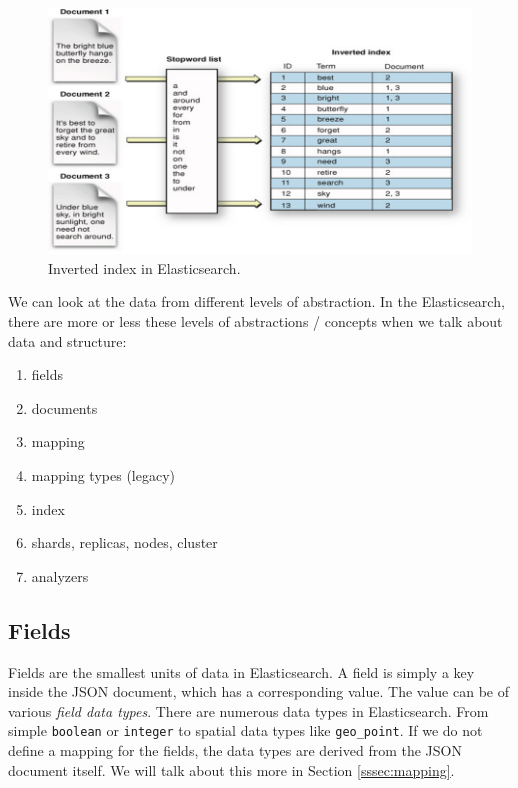 \documentclass[12pt,a4,twoside]{article}
\begin{document}
\begin{figure}[t]
\centering
\includegraphics[width=1\textwidth]{figures/inverted_index.png}
\caption{Inverted index in Elasticsearch. \cite{elastic_sharding}}
\label{fig:inverted_index}
\end{figure}

We can look at the data from different levels of abstraction. In the Elasticsearch, there are more or less these levels of abstractions / concepts when we talk about data and structure:

\begin{enumerate}[noitemsep]
\item fields
\item documents
\item mapping
\item mapping types (legacy)
\item index
\item shards, replicas, nodes, cluster
\item analyzers \cite{elastic_concepts}
\end{enumerate}

\subsection{Fields}

Fields are the smallest units of data in Elasticsearch. A field is simply a key inside the JSON document, which has a corresponding value. The value can be of various \textit{field data types}. There are numerous data types in Elasticsearch. From simple \texttt{boolean} or \texttt{integer} to spatial data types like \texttt{geo\_point}. If we do not define a mapping for the fields, the data types are derived from the JSON document itself. We will talk about this more in Section \ref{sssec:mapping}.
\end{document}
